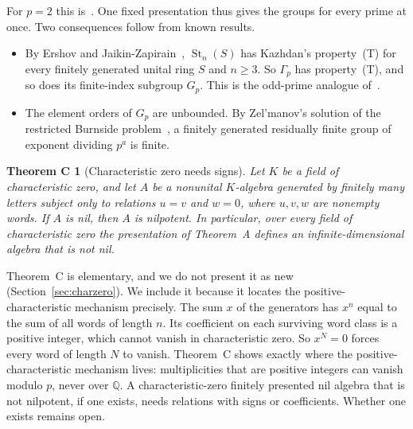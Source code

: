 \documentclass[11pt]{article}
\numberwithin{equation}{section}
\newtheorem*{theoremC}{Theorem C}
\theoremstyle{definition}
\theoremstyle{remark}
\newcommand{\Q}{\mathbb Q}
\DeclareMathOperator{\St}{St}
\begin{document}
For $p=2$ this is~\cite{OAI247periodic,OAI247rf}. One fixed presentation thus gives the groups for every prime at once.
Two consequences follow from known results.
\begin{itemize}[leftmargin=*]
\item By Ershov and Jaikin-Zapirain~\cite[Theorem~6.2]{ErshovJaikinZapirain2010}, $\St_n(S)$ has Kazhdan's property~(T)
  for every finitely generated unital ring $S$ and $n\geq3$. So $\Gamma_p$ has property~(T), and so does its
  finite-index subgroup $G_p$. This is the odd-prime analogue of~\cite[Corollary~1.2]{OAI247periodic}.
\item The element orders of $G_p$ are unbounded. By Zel'manov's solution of the restricted Burnside
  problem~\cite{ZelmanovOdd,ZelmanovTwo}, a finitely generated residually finite group of exponent dividing $p^a$ is
  finite.
\end{itemize}

\begin{theoremC}[Characteristic zero needs signs]
Let $K$ be a field of characteristic zero, and let $A$ be a nonunital $K$-algebra generated by finitely many letters
subject only to relations $u=v$ and $w=0$, where $u,v,w$ are nonempty words. If $A$ is nil, then $A$ is nilpotent. In
particular, over every field of characteristic zero the presentation of Theorem~A defines an infinite-dimensional
algebra that is not nil.
\end{theoremC}

Theorem~C is elementary, and we do not present it as new (Section~\ref{sec:charzero}). We include it because it locates
the positive-characteristic mechanism precisely. The sum $x$ of the generators has $x^n$ equal to the sum of all words of length $n$. Its coefficient
on each surviving word class is a positive integer, which cannot vanish in characteristic zero. So $x^N=0$ forces every
word of length $N$ to vanish. Theorem~C shows exactly where the positive-characteristic mechanism lives: multiplicities
that are positive integers can vanish modulo $p$, never over $\Q$. A characteristic-zero finitely presented nil algebra
that is not nilpotent, if one exists, needs relations with signs or coefficients. Whether one exists remains open.
\end{document}
